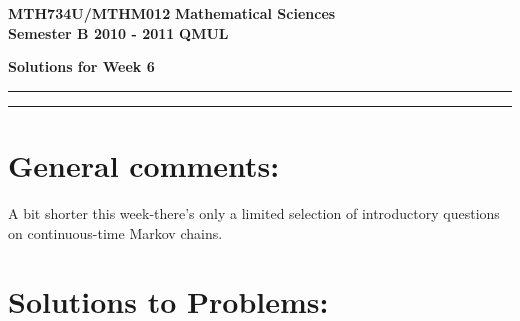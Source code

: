 \documentclass[11pt,a4paper]{article}
\begin{document}
  \newpage
  \textbf{MTH734U/MTHM012} \hfill \textbf{Mathematical Sciences}\\
  \textbf{Semester B 2010 - 2011} \hfill \textbf{QMUL}
  \begin{center}
    \textbf{\huge Solutions for Week 6}
  \end{center}
  \hrule \vspace{2mm} \hrule
  \section*{General comments:}
  A bit shorter this week-there's only a limited selection of introductory questions on continuous-time Markov chains.

  \section*{Solutions to Problems:}
\end{document}
